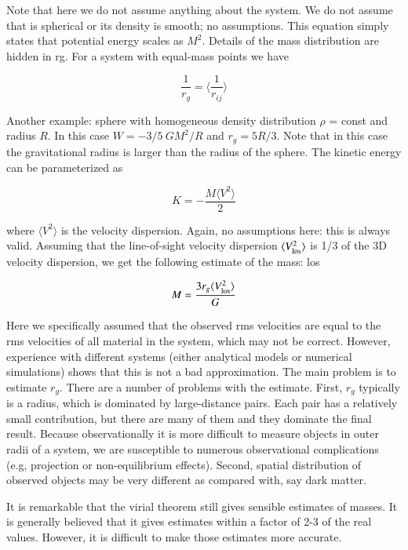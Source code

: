 Note that here we do not assume anything about the system. We do not assume that is spherical or its density is smooth; no assumptions. This equation simply states that potential energy scales as $M^2$. Details of the mass distribution are hidden in rg. For a system with equal-mass points we have
 
\begin{equation}
\frac{1}{r_g} = \langle \frac{1}{r_{ij}}\rangle 
\end{equation}


Another example: sphere with homogeneous density distribution $\rho $ = const and radius $R$. In this case $W = -3/5 \ GM^2/R$ and $r_g = 5R/3$. Note that in this case the gravitational radius is larger than the radius of the sphere. The kinetic energy can be parameterized as

\begin{equation}
K = -\frac{M\langle V^2\rangle}{2}
\end{equation}

where $\langle V^2\rangle$ is the velocity dispersion. Again, no assumptions here: this is always valid. Assuming that the line-of-sight velocity dispersion $\langle V^2_{\rm los}\rangle$ is 1/3 of the 3D velocity dispersion, we get the following estimate of the mass:
los

\begin{equation}
M = \frac{3r_g \langle V^2_{\rm los}\rangle }{G}
\end{equation}
 
Here we specifically assumed that the observed rms velocities are equal to the rms velocities of all material in the system, which may not be correct. However, experience with different systems (either analytical models or numerical simulations) shows that this is not a bad approximation. The main problem is to estimate $r_g$. There are a number of problems with the estimate. First, $r_g$ typically is a radius, which is dominated by large-distance pairs. Each pair has a relatively small contribution, but there are many of them and they dominate the final result. Because observationally it is more difficult to measure objects in outer radii of a system, we are susceptible to numerous observational complications (e.g, projection or non-equilibrium effects). Second, spatial distribution of observed objects may be very different as compared with, say dark matter.

It is remarkable that the virial theorem still gives sensible estimates of masses. It is generally believed that it gives estimates within a factor of 2-3 of the real values. However, it is difficult to make those estimates more accurate.

